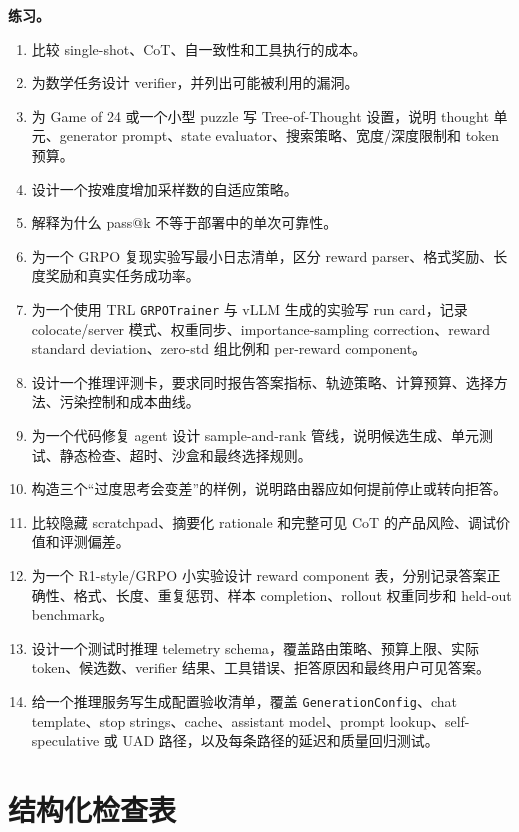 \documentclass[UTF8,zihao=-4,openany]{ctexbook}
\begin{document}
\textbf{练习。}
\begin{enumerate}
\item 比较 single-shot、CoT、自一致性和工具执行的成本。
\item 为数学任务设计 verifier，并列出可能被利用的漏洞。
\item 为 Game of 24 或一个小型 puzzle 写 Tree-of-Thought 设置，说明 thought 单元、generator prompt、state evaluator、搜索策略、宽度/深度限制和 token 预算。
\item 设计一个按难度增加采样数的自适应策略。
\item 解释为什么 pass@k 不等于部署中的单次可靠性。
\item 为一个 GRPO 复现实验写最小日志清单，区分 reward parser、格式奖励、长度奖励和真实任务成功率。
\item 为一个使用 TRL \texttt{GRPOTrainer} 与 vLLM 生成的实验写 run card，记录 colocate/server 模式、权重同步、importance-sampling correction、reward standard deviation、zero-std 组比例和 per-reward component。
\item 设计一个推理评测卡，要求同时报告答案指标、轨迹策略、计算预算、选择方法、污染控制和成本曲线。
\item 为一个代码修复 agent 设计 sample-and-rank 管线，说明候选生成、单元测试、静态检查、超时、沙盒和最终选择规则。
\item 构造三个“过度思考会变差”的样例，说明路由器应如何提前停止或转向拒答。
\item 比较隐藏 scratchpad、摘要化 rationale 和完整可见 CoT 的产品风险、调试价值和评测偏差。
\item 为一个 R1-style/GRPO 小实验设计 reward component 表，分别记录答案正确性、格式、长度、重复惩罚、样本 completion、rollout 权重同步和 held-out benchmark。
\item 设计一个测试时推理 telemetry schema，覆盖路由策略、预算上限、实际 token、候选数、verifier 结果、工具错误、拒答原因和最终用户可见答案。
\item 给一个推理服务写生成配置验收清单，覆盖 \texttt{GenerationConfig}、chat template、stop strings、cache、assistant model、prompt lookup、self-speculative 或 UAD 路径，以及每条路径的延迟和质量回归测试。
\end{enumerate}

\section{结构化检查表}
\end{document}
